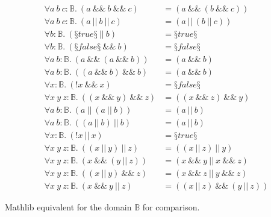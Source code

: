 \begin{conjectureset}[H]
\begin{align}
\forall a\ b\ c : \mathbb{B}.\ (a\ \&\&\ b\ \&\&\ c) &= (a\ \&\&\ (b\ \&\&\ c))\ \label{overlapenum:and_assoc2}\\
\forall a\ b\ c : \mathbb{B}.\ (a\ ||\ b\ ||\ c) &= (a\ ||\ (b\ ||\ c))\ \label{overlapenum:or_assoc2}\\
\forall b : \mathbb{B}.\ (§true§\ ||\ b) &= §true§\ \label{overlapenum:false_negative1}\\
\forall b : \mathbb{B}.\ (§false§\ \&\&\ b) &= §false§\ \label{overlapenum:false_negative2}\\
\forall a\ b : \mathbb{B}.\ (a\ \&\&\ (a\ \&\&\ b)) &= (a\ \&\&\ b)\ \label{overlapenum:false_negative3}\\
\forall a\ b : \mathbb{B}.\ ((a\ \&\&\ b)\ \&\&\ b) &= (a\ \&\&\ b)\ \label{overlapenum:false_negative4}\\
\forall x : \mathbb{B}.\ (!x\ \&\&\ x) &= §false§\ \label{overlapenum:false_negative5}\\
\forall x\ y\ z : \mathbb{B}.\ ((x\ \&\&\ y)\ \&\&\ z) &= ((x\ \&\&\ z)\ \&\&\ y)\ \label{overlapenum:false_negative6}\\
\forall a\ b : \mathbb{B}.\ (a\ ||\ (a\ ||\ b)) &= (a\ ||\ b)\ \label{overlapenum:false_negative7}\\
\forall a\ b : \mathbb{B}.\ ((a\ ||\ b)\ ||\ b) &= (a\ ||\ b)\ \label{overlapenum:false_negative8}\\
\forall x : \mathbb{B}.\ (!x\ ||\ x) &= §true§\ \label{overlapenum:false_negative9}\\
\forall x\ y\ z : \mathbb{B}.\ ((x\ ||\ y)\ ||\ z) &= ((x\ ||\ z)\ ||\ y)\ \label{overlapenum:false_negative10}\\
\forall x\ y\ z : \mathbb{B}.\ (x\ \&\&\ (y\ ||\ z)) &= (x\ \&\&\ y\ ||\ x\ \&\&\ z)\ \label{overlapenum:false_negative11}\\
\forall x\ y\ z : \mathbb{B}.\ ((x\ ||\ y)\ \&\&\ z) &= (x\ \&\&\ z\ ||\ y\ \&\&\ z)\ \label{overlapenum:false_negative12}\\
\forall x\ y\ z : \mathbb{B}.\ (x\ \&\&\ y\ ||\ z) &= ((x\ ||\ z)\ \&\&\ (y\ ||\ z)) \label{overlapenum:false_negative13}
\end{align}
\vspace{-0.9cm}
\caption{Mathlib equivalent for the domain $\mathbb{B}$ for comparison.}\label{eqs:mathlib_enum:compare}
\end{conjectureset}
